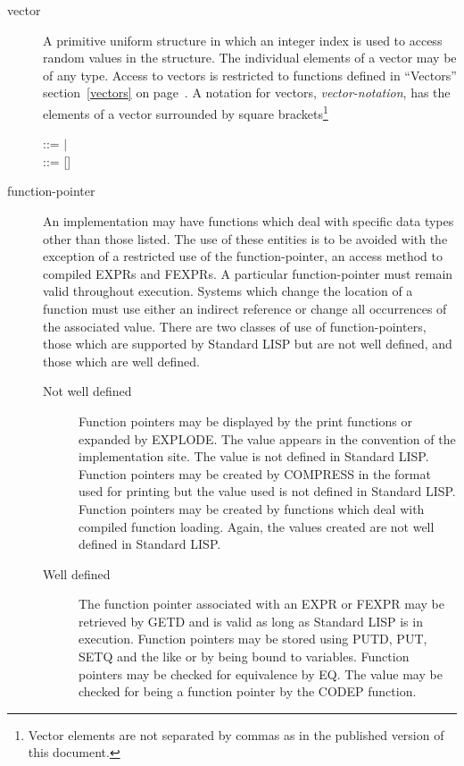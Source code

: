 \documentclass[11pt,letterpaper]{book}
\begin{document}
\begin{description}
\item[vector]  A primitive uniform structure in which
an integer index is used to access random values in the structure. The
individual elements of a vector may be of any type. Access to vectors
is restricted to functions defined in ``Vectors''
section~\ref{vectors} on page~\pageref{vectors}. A notation for
vectors, {\em vector-notation}, has the elements of a vector
surrounded
by square brackets\footnote{Vector elements are not separated by
commas as in the published version of this document.}


\begin{tabbing}
 ::= $\mid$  \\
 ::= []
\end{tabbing}

\item[function-pointer]  An implementation may have
functions which deal with specific data types other than those listed.
The use of these entities is to be avoided with the exception of a
restricted use of the function-pointer, an access method to compiled
EXPRs and FEXPRs. A particular function-pointer must remain valid
 
throughout execution. Systems which change the location of a function
must use either an indirect reference or change all occurrences of the
associated value. There are two classes of use of function-pointers,
those which are supported by Standard LISP but are not well defined,
and those which are well defined.

\begin{description}
\item[Not well defined] Function pointers may be displayed by the print
functions or expanded by EXPLODE.  The value appears in
the convention of the implementation site. The value is not defined in
Standard LISP. Function pointers may be created by COMPRESS
 in the format used for printing but the value used is
not defined in Standard LISP. Function pointers may be created by
functions which deal with compiled function loading. Again, the values
created are not well defined in Standard LISP.

\item[Well defined] The function pointer associated with an EXPR or
FEXPR may be retrieved by GETD  and is valid as long as
Standard LISP is in execution. Function pointers may be stored using
   PUTD, PUT, SETQ and the like or by
being bound to variables.  Function pointers may be checked for
equivalence by EQ.  The value may be
checked for being a function pointer by the CODEP function.
\end{description}
\end{description}
\end{document}
